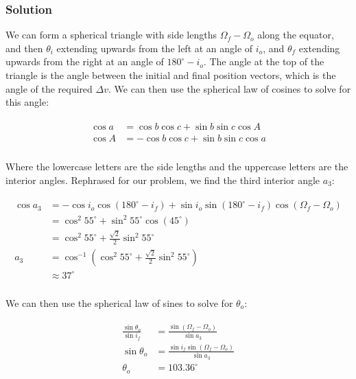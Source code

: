 \documentclass[
]{article}
\begin{document}
\subsubsection{Solution}\label{solution}

We can form a spherical triangle with side lengths
\(\Omega_f - \Omega_o\) along the equator, and then \(\theta_i\)
extending upwards from the left at an angle of \(i_o\), and \(\theta_f\)
extending upwards from the right at an angle of \(180^\circ-i_o\). The
angle at the top of the triangle is the angle between the initial and
final position vectors, which is the angle of the required \(\Delta v\).
We can then use the spherical law of cosines to solve for this angle:

\[\begin{aligned}
\begin{aligned}
    \cos a &= \cos b \cos c + \sin b \sin c \cos A \\
    \cos A &= - \cos b \cos c + \sin b \sin c \cos a \\
\end{aligned}
\end{aligned}\]

Where the lowercase letters are the side lengths and the uppercase
letters are the interior angles. Rephrased for our problem, we find the
third interior angle \(a_3\):

\[\begin{aligned}
\begin{aligned}
    \cos a_3 &= - \cos i_o \cos (180^\circ - i_f) + \sin i_o \sin (180^\circ - i_f) \cos(\Omega_f - \Omega_o) \\
    &= \cos^2 55^\circ + \sin^2 55^\circ \cos(45^\circ) \\
    &= \cos^2 55^\circ + \frac{\sqrt{2}}{2} \sin^2 55^\circ \\
    a_3 &= \cos^{-1} \left( \cos^2 55^\circ + \frac{\sqrt{2}}{2} \sin^2 55^\circ \right) \\
    &\approx 37^\circ \\
\end{aligned}
\end{aligned}\]

We can then use the spherical law of sines to solve for \(\theta_o\):

\[\begin{aligned}
\begin{aligned}
    \frac{\sin\theta_o}{\sin i_f} &= \frac{\sin(\Omega_f - \Omega_o)}{\sin a_3} \\
    \sin\theta_o &= \frac{\sin i_f \sin(\Omega_f - \Omega_o)}{\sin a_3} \\
    \theta_o &= 103.36^\circ \\
\end{aligned}
\end{aligned}\]
\end{document}
